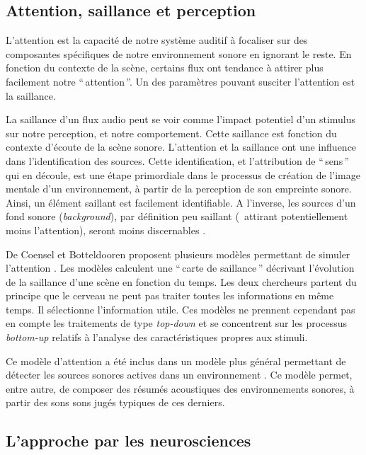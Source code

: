 {\subsection{Attention, saillance et perception}

L'attention est la capacité de notre système auditif à focaliser sur des composantes spécifiques de notre environnement sonore en ignorant le reste. En fonction du contexte de la scène, certains flux ont tendance à attirer plus facilement notre ``\,attention\,''. Un des paramètres pouvant susciter l’attention est la saillance.

La saillance d’un flux audio peut se voir comme l’impact potentiel d’un stimulus sur notre perception, et notre comportement. Cette saillance est fonction du contexte d'écoute de la scène sonore. L’attention et la saillance ont une influence dans l’identification des sources. Cette identification, et l'attribution de ``\,sens\,'' qui en découle, est une étape primordiale dans le processus de création de l’image mentale d’un environnement, à partir de la perception de son empreinte sonore. Ainsi, un élément saillant est facilement identifiable. A l'inverse, les sources d'un fond sonore (\emph{background}), par définition peu saillant (\ie~attirant potentiellement moins l’attention), seront moins discernables \citep{elhilali2009interaction}.

De Coensel et Botteldooren proposent plusieurs modèles permettant de simuler l’attention \citep{botteldooren2009role,de2010model,de2010application}. Les modèles calculent une ``\,carte de saillance\,'' décrivant l’évolution de la saillance d’une scène en fonction du temps. Les deux chercheurs partent du principe que le cerveau ne peut pas traiter toutes les informations en même temps. Il sélectionne l'information utile. Ces modèles ne prennent cependant pas en compte les traitements de type \emph{top-down} et se concentrent sur les processus \emph{bottom-up} relatifs à l’analyse des caractéristiques propres aux stimuli.

Ce modèle d'attention a été inclus dans un modèle plus général permettant de détecter les sources sonores actives dans un environnement \citep{oldoni2012computational,oldoni2013computational}. Ce modèle permet, entre autre, de composer des résumés acoustiques des environnements sonores, à partir des sons sons jugés typiques de ces derniers.

\subsection{L'approche par les neurosciences}

}
